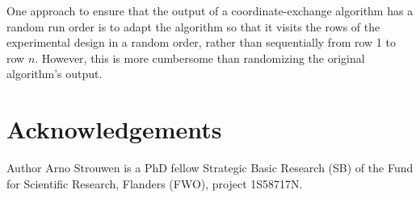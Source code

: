 {\color{red}One approach to ensure that the output of a coordinate-exchange algorithm has a random run order is to adapt the algorithm so that it visits the rows of the experimental design in a random order, rather than sequentially from row 1 to row $n$. However, this is more cumbersome than randomizing the original algorithm's output}.
 
\section*{Acknowledgements}
Author Arno Strouwen is a PhD fellow Strategic Basic Research (SB) of the Fund for
Scientific Research, Flanders (FWO), project 1S58717N.
\small



